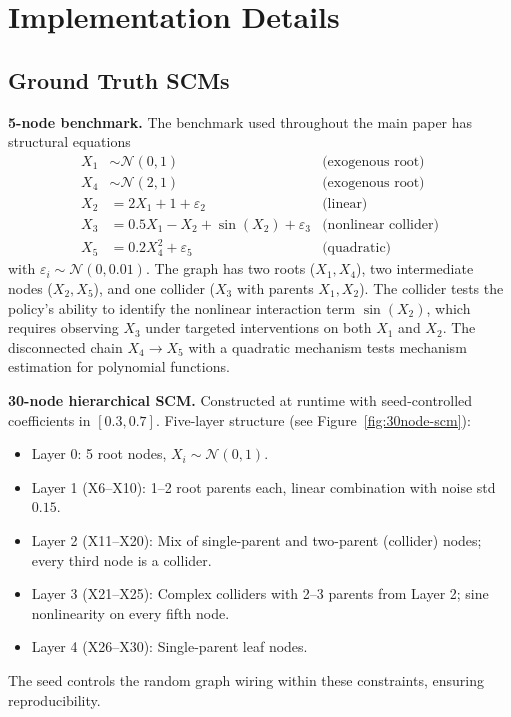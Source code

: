 \section{Implementation Details}
\label{app:impl}

\subsection{Ground Truth SCMs}
\label{app:scms}

\textbf{5-node benchmark.} The benchmark used throughout the main paper has structural equations
\begin{align*}
X_1 &\sim \mathcal{N}(0, 1) & \text{(exogenous root)} \\
X_4 &\sim \mathcal{N}(2, 1) & \text{(exogenous root)} \\
X_2 &= 2 X_1 + 1 + \varepsilon_2 & \text{(linear)} \\
X_3 &= 0.5 X_1 - X_2 + \sin(X_2) + \varepsilon_3 & \text{(nonlinear collider)} \\
X_5 &= 0.2 X_4^2 + \varepsilon_5 & \text{(quadratic)}
\end{align*}
with $\varepsilon_i \sim \mathcal{N}(0, 0.01)$. The graph has two roots ($X_1, X_4$), two intermediate nodes ($X_2, X_5$), and one collider ($X_3$ with parents $X_1, X_2$). The collider tests the policy's ability to identify the nonlinear interaction term $\sin(X_2)$, which requires observing $X_3$ under targeted interventions on both $X_1$ and $X_2$. The disconnected chain $X_4 \to X_5$ with a quadratic mechanism tests mechanism estimation for polynomial functions.

\textbf{30-node hierarchical SCM.} Constructed at runtime with seed-controlled coefficients in $[0.3, 0.7]$. Five-layer structure (see Figure~\ref{fig:30node-scm}):
\begin{itemize}[leftmargin=1.2em,topsep=0.2em,itemsep=0.1em]
\item Layer 0: 5 root nodes, $X_i \sim \mathcal{N}(0,1)$.
\item Layer 1 (X6--X10): 1--2 root parents each, linear combination with noise std $0.15$.
\item Layer 2 (X11--X20): Mix of single-parent and two-parent (collider) nodes; every third node is a collider.
\item Layer 3 (X21--X25): Complex colliders with 2--3 parents from Layer 2; sine nonlinearity on every fifth node.
\item Layer 4 (X26--X30): Single-parent leaf nodes.
\end{itemize}
The seed controls the random graph wiring within these constraints, ensuring reproducibility.

